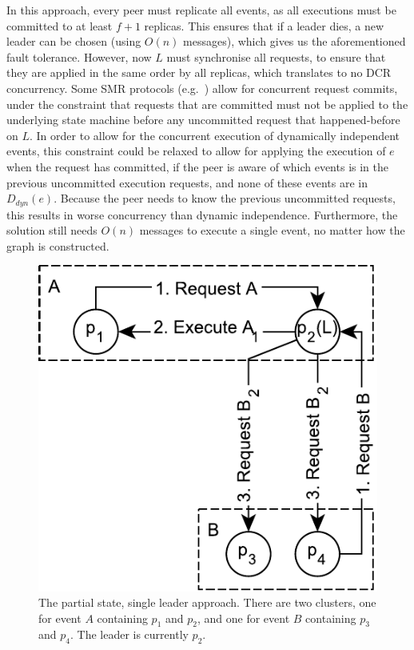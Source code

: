 \documentclass{article}
\begin{document}
	In this approach, every peer must replicate all events, as all executions must be committed to at least $f+1$ replicas.
	This ensures that if a leader dies, a new leader can be chosen (using $O(n)$ messages), which gives us the aforementioned fault tolerance.
	However, now $L$ must synchronise all requests, to ensure that they are applied in the same order by all replicas, which translates to no DCR concurrency.
	Some SMR protocols (e.g.~\cite{castro_practical_1999}) allow for concurrent request commits, under the constraint that requests that are committed must not be applied to the underlying state machine before any uncommitted request that happened-before~\cite{lamport_time_1978} on $L$.
	In order to allow for the concurrent execution of dynamically independent events, this constraint could be relaxed to allow for applying the execution of $e$ when the request has committed, if the peer is aware of which events is in the previous uncommitted execution requests, and none of these events are in $D_{dyn}(e)$.
	Because the peer needs to know the previous uncommitted requests, this results in worse concurrency than dynamic independence.
	Furthermore, the solution still needs $O(n)$ messages to execute a single event, no matter how the graph is constructed.

    \FloatBarrier
    \begin{figure}[ht!]
        \center
        \includegraphics[scale=0.7]{figures/dcr-graphs/partial-state-single-leader-approach.pdf}
        \caption{The partial state, single leader approach.
        There are two clusters, one for event $A$ containing $p_1$ and $p_2$, and one for event $B$ containing $p_3$ and $p_4$.
        The leader is currently $p_2$.}
        \label{fig:partial-state-single-leader-approach}
    \end{figure}
    \FloatBarrier
\end{document}
